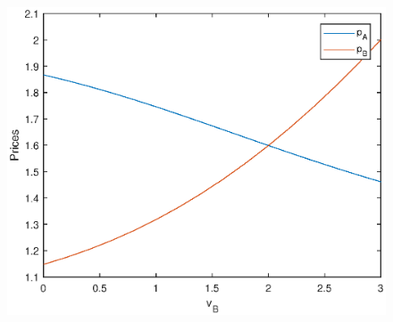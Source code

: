 \documentclass[10pt, letterpaper]{article}
\begin{document}
\begin{figure}[!h]
\begin{center}
  \includegraphics[width=\linewidth]{figure.eps}
  \caption{}
  \label{fig:graph}
\end{center}
\end{figure}


\clearpage
\end{document}
